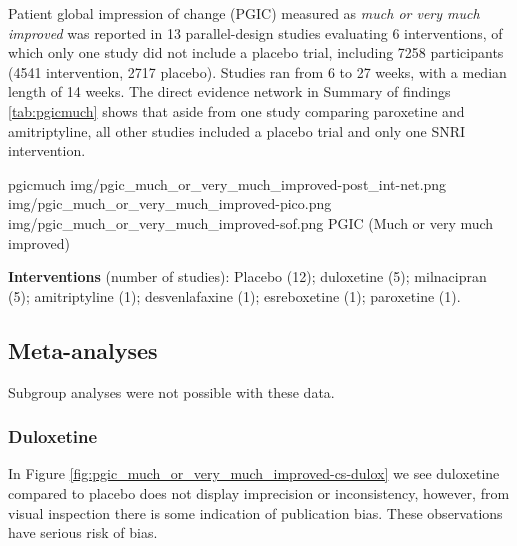 \documentclass{report}\usepackage[]{graphicx}\usepackage[]{color}
\begin{document}
Patient global impression of change (PGIC) measured as \emph{much or very much improved} was reported in 13 parallel-design studies evaluating 6 interventions, of which only one study did not include a placebo trial, including 7258 participants (4541 intervention, 2717 placebo). Studies ran from 6 to 27 weeks, with a median length of 14 weeks. The direct evidence network in Summary of findings \ref{tab:pgicmuch} shows that aside from one study comparing paroxetine and amitriptyline, all other studies included a placebo trial and only one SNRI intervention.

\soffignew
{pgicmuch}
{img/pgic_much_or_very_much_improved-post_int-net.png}
{img/pgic_much_or_very_much_improved-pico.png}
{img/pgic_much_or_very_much_improved-sof.png}
{PGIC (Much or very much improved)}

\textbf{Interventions} (number of studies): Placebo (12); duloxetine (5); milnacipran (5); amitriptyline (1); desvenlafaxine (1); esreboxetine (1); paroxetine (1).


\subsection{Meta-analyses}

Subgroup analyses were not possible with these data.

\subsubsection{Duloxetine}

In Figure \ref{fig:pgic_much_or_very_much_improved-cs-dulox} we see duloxetine compared to placebo does not display imprecision or inconsistency, however, from visual inspection there is some indication of publication bias. These observations have serious risk of bias.
\end{document}

